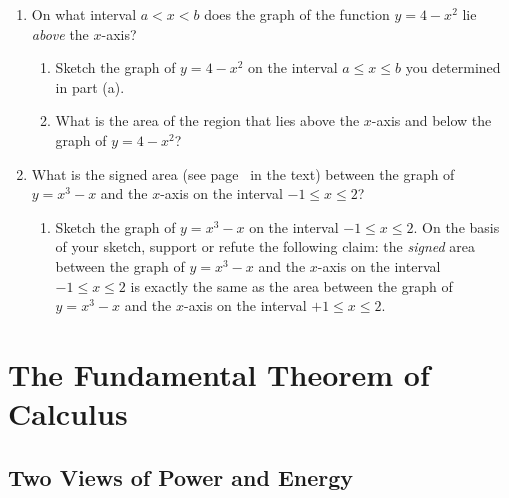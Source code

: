\begin{enumerate}
\begin{enumerate}
  \item Using your observations in part (c), explain why ${\displaystyle
  \int_0^{\pi} \sin^2{x}\,dx}$ is {\em exactly\/} $\pi/2$.



\end{enumerate}
\item On what interval $a < x < b$ does the graph of the
function $y = 4 - x^2$ lie {\em above\/} the $x$-axis?

  \begin{enumerate}
  \item Sketch the graph of $y = 4 - x^2$ on the interval $a \leq x \leq
b$ you determined in part (a).

  \item What is the area of the region that lies above the $x$-axis and
below the graph of $y = 4 - x^2$?



\end{enumerate}
\item What is the signed area (see page~\pageref{signed} in the text)
between the graph of $y = x^3 - x$ and the $x$-axis on the interval
$-1 \leq x \leq 2$?

  \begin{enumerate}
  \item Sketch the graph of $y = x^3 - x$ on the interval $-1 \leq x \leq
2$.  On the basis of your sketch, support or refute the following
claim: the {\em signed\/} area between the graph of $y = x^3 - x$ and
the $x$-axis on the interval $-1 \leq x \leq 2$ is exactly the same as
the area between the graph of $y = x^3 - x$ and the $x$-axis on the
interval $+1 \leq x \leq 2$.




\end{enumerate}
\end{enumerate}
\section{The Fundamental Theorem of Calculus}
\label{sec:the-fundamental-theorem-of-calculus}

\subsection{Two Views of Power and Energy}
\label{subsec:two-views-of-power-and-energy}

